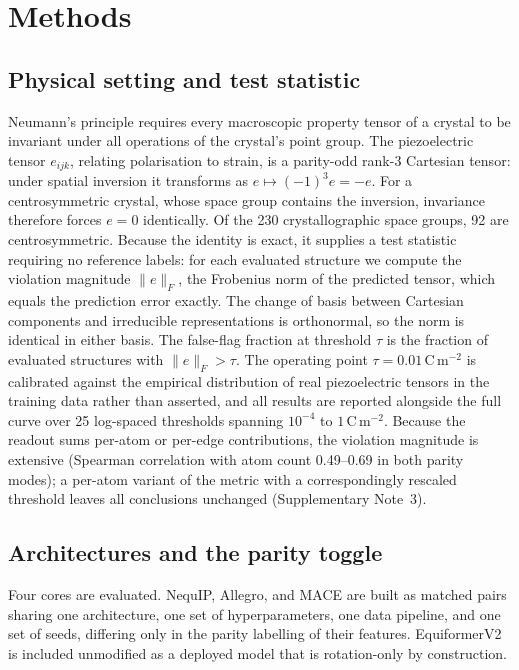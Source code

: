 \section*{Methods}

\subsection*{Physical setting and test statistic}

Neumann's principle requires every macroscopic property tensor of a crystal to be invariant under all operations of the crystal's point group. The piezoelectric tensor $e_{ijk}$, relating polarisation to strain, is a parity-odd rank-3 Cartesian tensor: under spatial inversion it transforms as $e \mapsto (-1)^{3} e = -e$. For a centrosymmetric crystal, whose space group contains the inversion, invariance therefore forces $e = 0$ identically. Of the 230 crystallographic space groups, 92 are centrosymmetric. Because the identity is exact, it supplies a test statistic requiring no reference labels: for each evaluated structure we compute the violation magnitude $\lVert e \rVert_F$, the Frobenius norm of the predicted tensor, which equals the prediction error exactly. The change of basis between Cartesian components and irreducible representations is orthonormal, so the norm is identical in either basis. The false-flag fraction at threshold $\tau$ is the fraction of evaluated structures with $\lVert e \rVert_F > \tau$. The operating point $\tau = 0.01$\,C\,m$^{-2}$ is calibrated against the empirical distribution of real piezoelectric tensors in the training data rather than asserted, and all results are reported alongside the full curve over 25 log-spaced thresholds spanning $10^{-4}$ to $1$\,C\,m$^{-2}$. Because the readout sums per-atom or per-edge contributions, the violation magnitude is extensive (Spearman correlation with atom count 0.49--0.69 in both parity modes); a per-atom variant of the metric with a correspondingly rescaled threshold leaves all conclusions unchanged (Supplementary Note~3).

\subsection*{Architectures and the parity toggle}

Four cores are evaluated. NequIP, Allegro, and MACE are built as matched pairs sharing one architecture, one set of hyperparameters, one data pipeline, and one set of seeds, differing only in the parity labelling of their features. EquiformerV2 is included unmodified as a deployed model that is rotation-only by construction.

